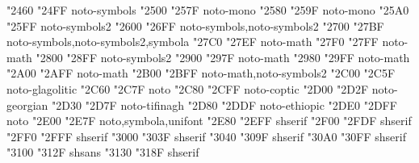 \documentclass{article}
\begin{document}
                         {  "2460} {  "24FF} {noto-symbols}
                                    {  "2500} {  "257F} {noto-mono}
                                 {  "2580} {  "259F} {noto-mono}
                               {  "25A0} {  "25FF} {noto-symbols2}
                          {  "2600} {  "26FF} {noto-symbols,noto-symbols2}
                                       {  "2700} {  "27BF} {noto-symbols,noto-symbols2,symbola}
           {  "27C0} {  "27EF} {noto-math}
                          {  "27F0} {  "27FF} {noto-math}
                               {  "2800} {  "28FF} {noto-symbols2}
                          {  "2900} {  "297F} {noto-math}
           {  "2980} {  "29FF} {noto-math}
            {  "2A00} {  "2AFF} {noto-math}
               {  "2B00} {  "2BFF} {noto-math,noto-symbols2}
                                     {  "2C00} {  "2C5F} {noto-glagolitic}
                               {  "2C60} {  "2C7F} {noto}
                                         {  "2C80} {  "2CFF} {noto-coptic}
                            {  "2D00} {  "2D2F} {noto-georgian}
                                       {  "2D30} {  "2D7F} {noto-tifinagh}
                              {  "2D80} {  "2DDF} {noto-ethiopic}
                            {  "2DE0} {  "2DFF} {noto}
                       {  "2E00} {  "2E7F} {noto,symbola,unifont}
                        {  "2E80} {  "2EFF} {shserif}
                                {  "2F00} {  "2FDF} {shserif}
             {  "2FF0} {  "2FFF} {shserif}
                    {  "3000} {  "303F} {shserif}
                                       {  "3040} {  "309F} {shserif}
                                       {  "30A0} {  "30FF} {shserif}
                                       {  "3100} {  "312F} {shsans}
                      {  "3130} {  "318F} {shserif}
\end{document}
